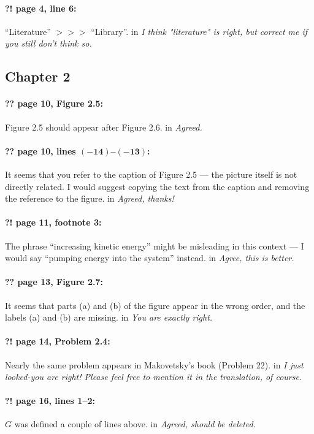 \documentclass[twoside]{article}
\begin{document}
\paragraph{?! page 4, line 6:} “Literature” $>\!>\!>$ “Library”.
 in {\it  I think "literature" is right, but correct me if you still don't think so.}

\subsection*{Chapter 2}

\paragraph{?? page 10, Figure 2.5:} Figure 2.5 should appear after Figure 2.6.
 in {\it  Agreed.
} 
\paragraph{?? page 10, lines $\bm{(-14)}$--$\bm{(-13)}$:} It seems that you refer to the caption of Figure 2.5 — the picture itself is not directly related. I would suggest copying the text from the caption and removing the reference to the figure.
 in {\it  Agreed, thanks!} 

\paragraph{?! page 11, footnote 3:} The phrase “increasing kinetic energy” might be misleading in this context — I would say “pumping energy into the system” instead.
 in {\it Agree, this is better. } 

\paragraph{?? page 13, Figure 2.7:} It seems that parts (a) and (b) of the figure appear in the wrong order, and the labels (a) and (b) are missing.
 in {\it  You are exactly right. } 

\paragraph{?! page 14, Problem 2.4:} Nearly the same problem appears in Makovetsky’s book (Problem 22).
 in {\it I just looked-you are right! Please feel free to mention it in the translation, of course. } 

\paragraph{?! page 16, lines 1--2:} $G$ was defined a couple of lines above.
 in {\it Agreed, should be deleted. } 
\end{document}
